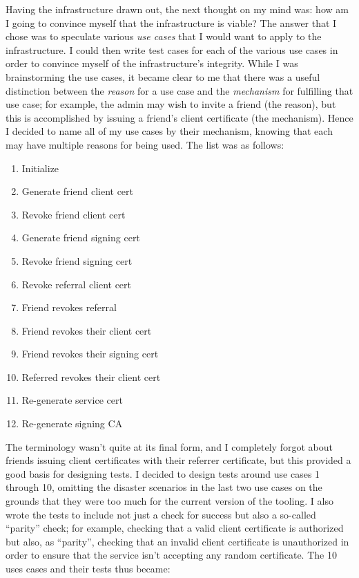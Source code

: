 \documentclass{article}
\begin{document}
Having the infrastructure drawn out, the next thought on my mind was: how am I going to convince myself that the infrastructure is viable?  The answer that I chose was to speculate various \emph{use cases} that I would want to apply to the infrastructure.  I could then write test cases for each of the various use cases in order to convince myself of the infrastructure's integrity.  While I was brainstorming the use cases, it became clear to me that there was a useful distinction between the \emph{reason} for a use case and the \emph{mechanism} for fulfilling that use case; for example, the admin may wish to invite a friend (the reason), but this is accomplished by issuing a friend's client certificate (the mechanism).  Hence I decided to name all of my use cases by their mechanism, knowing that each may have multiple reasons for being used.  The list was as follows:
\begin{enumerate}
	\item Initialize
	\item Generate friend client cert
	\item Revoke friend client cert
	\item Generate friend signing cert
	\item Revoke friend signing cert
	\item Revoke referral client cert
	\item Friend revokes referral
	\item Friend revokes their client cert
	\item Friend revokes their signing cert
	\item Referred revokes their client cert
	\item Re-generate service cert
	\item Re-generate signing CA
\end{enumerate}
The terminology wasn't quite at its final form, and I completely forgot about friends issuing client certificates with their referrer certificate, but this provided a good basis for designing tests.  I decided to design tests around use cases 1 through 10, omitting the disaster scenarios in the last two use cases on the grounds that they were too much for the current version of the tooling.  I also wrote the tests to include not just a check for success but also a so-called ``parity'' check; for example, checking that a valid client certificate is authorized but also, as ``parity'', checking that an invalid client certificate is unauthorized in order to ensure that the service isn't accepting any random certificate.  The 10 uses cases and their tests thus became:
\end{document}
